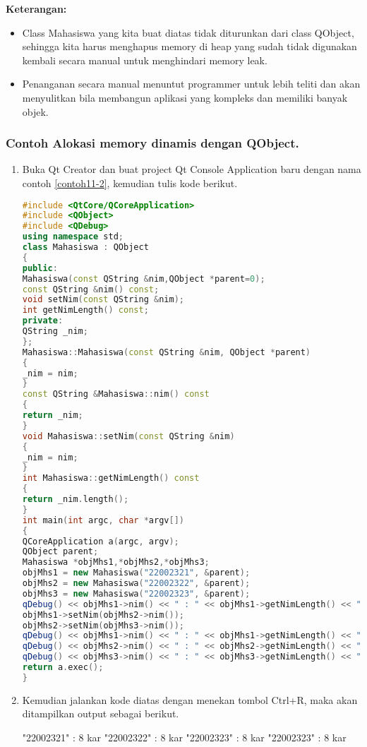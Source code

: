 \textbf{Keterangan:}

\begin{itemize}

\item
  Class Mahasiswa yang kita buat diatas tidak diturunkan dari class
  QObject, sehingga kita harus menghapus memory di heap yang sudah tidak
  digunakan kembali secara manual untuk menghindari memory leak.
\item
  Penanganan secara manual menuntut programmer untuk lebih teliti dan
  akan menyulitkan bila membangun aplikasi yang kompleks dan memiliki
  banyak objek.
\end{itemize}

\subsubsection*{Contoh  Alokasi memory dinamis dengan QObject.}

\begin{enumerate}

\item
  Buka Qt Creator dan buat project Qt Console Application baru dengan
  nama contoh \ref{contoh11-2}, kemudian tulis kode berikut.

\begin{lstlisting}[language=c++, caption=Alokasi memory dinamis dengan QObject, label=contoh11-2]
#include <QtCore/QCoreApplication>
#include <QObject>
#include <QDebug>
using namespace std;
class Mahasiswa : QObject
{
public:
Mahasiswa(const QString &nim,QObject *parent=0);
const QString &nim() const;
void setNim(const QString &nim);
int getNimLength() const;
private:
QString _nim;
};
Mahasiswa::Mahasiswa(const QString &nim, QObject *parent)
{
_nim = nim;
}
const QString &Mahasiswa::nim() const
{
return _nim;
}
void Mahasiswa::setNim(const QString &nim)
{
_nim = nim;
}
int Mahasiswa::getNimLength() const
{
return _nim.length();
}
int main(int argc, char *argv[])
{
QCoreApplication a(argc, argv);
QObject parent;
Mahasiswa *objMhs1,*objMhs2,*objMhs3;
objMhs1 = new Mahasiswa("22002321", &parent);
objMhs2 = new Mahasiswa("22002322", &parent);
objMhs3 = new Mahasiswa("22002323", &parent);
qDebug() << objMhs1->nim() << " : " << objMhs1->getNimLength() << " kar";
objMhs1->setNim(objMhs2->nim());
objMhs2->setNim(objMhs3->nim());
qDebug() << objMhs1->nim() << " : " << objMhs1->getNimLength() << " kar";
qDebug() << objMhs2->nim() << " : " << objMhs2->getNimLength() << " kar";
qDebug() << objMhs3->nim() << " : " << objMhs3->getNimLength() << " kar";
return a.exec();
}
\end{lstlisting}
\item
  Kemudian jalankan kode diatas dengan menekan tombol Ctrl+R, maka akan
  ditampilkan output sebagai berikut.

\begin{lcverbatim}
"22002321"  :  8  kar
"22002322"  :  8  kar
"22002323"  :  8  kar
"22002323"  :  8  kar
\end{lcverbatim}
\end{enumerate}

